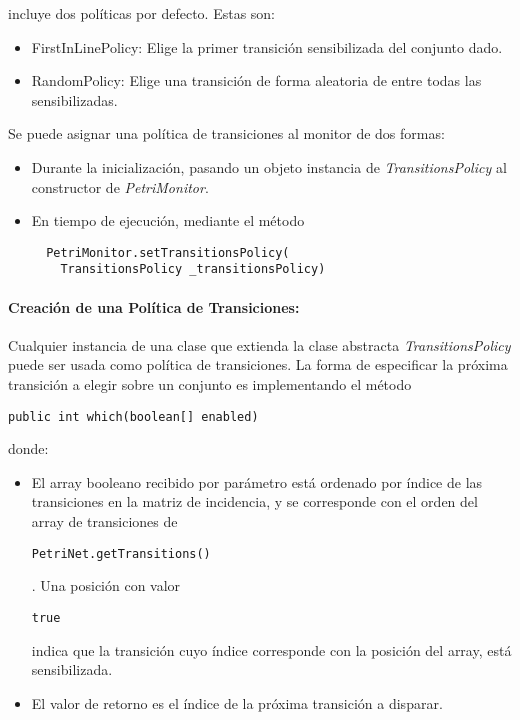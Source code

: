 \javapetriconcurrencymonitor incluye dos políticas por defecto. Estas son:
\begin{itemize}
    \item FirstInLinePolicy: Elige la primer transición sensibilizada del
    conjunto dado.
    \item RandomPolicy: Elige una transición de forma aleatoria de entre todas
    las sensibilizadas.
\end{itemize}

Se puede asignar una política de transiciones al monitor de dos formas:

\begin{itemize}
    \item Durante la inicialización, pasando un objeto instancia de
    \textit{TransitionsPolicy} al constructor de \textit{PetriMonitor}.
    \item En tiempo de ejecución, mediante el método\\ {
    \begin{verbatim}
  PetriMonitor.setTransitionsPolicy(
    TransitionsPolicy _transitionsPolicy)
    \end{verbatim}
    }
\end{itemize}

\paragraph{Creación de una Política de Transiciones:}
Cualquier instancia de una clase que extienda la clase abstracta
\textit{TransitionsPolicy} puede ser usada como política de transiciones.
La forma de especificar la próxima transición a elegir sobre un conjunto es
implementando el método {
\begin{verbatim}
public int which(boolean[] enabled)
\end{verbatim}
} donde:
\begin{itemize}
    \item El array booleano recibido por parámetro está ordenado por índice de
    las transiciones en la matriz de incidencia, y se corresponde con el orden
    del array de transiciones de {
    \begin{verbatim}
PetriNet.getTransitions()
    \end{verbatim}
    }. Una posición con valor {
    \begin{verbatim}
true
    \end{verbatim}
    } indica que la transición cuyo índice corresponde con la posición del
    array, está sensibilizada.
    \item El valor de retorno es el índice de la próxima transición a disparar.
\end{itemize}

